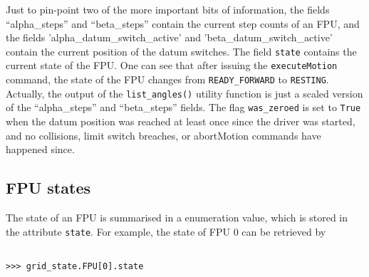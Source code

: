 \documentclass{scrartcl}[12pt,a4paper]
\begin{document}
Just to pin-point two of the more important bits of information, the
fields ``alpha\_steps'' and ``beta\_steps'' contain the current step
counts of an FPU, and the fields 'alpha\_datum\_switch\_active' and
'beta\_datum\_switch\_active' contain the current position of the
datum switches. The field \texttt{state} contains the current state of
the FPU. One can see that after issuing the \texttt{executeMotion}
command, the state of the FPU changes from \texttt{READY\_FORWARD} to
\texttt{RESTING}. Actually, the output of the \texttt{list\_angles()}
utility function is just a scaled version of the ``alpha\_steps'' and
``beta\_steps'' fields. The flag \texttt{was\_zeroed} is set to
\texttt{True} when the datum position was reached at least once since
the driver was started, and no collisions, limit switch breaches, or
abortMotion commands have happened since.

\subsection{FPU states}
The state of an FPU is summarised in a enumeration value, which is
stored in the attribute \texttt{state}. For example, the state of FPU 0
can be retrieved by

\begin{verbatim}

>>> grid_state.FPU[0].state
\end{verbatim}
\end{document}
